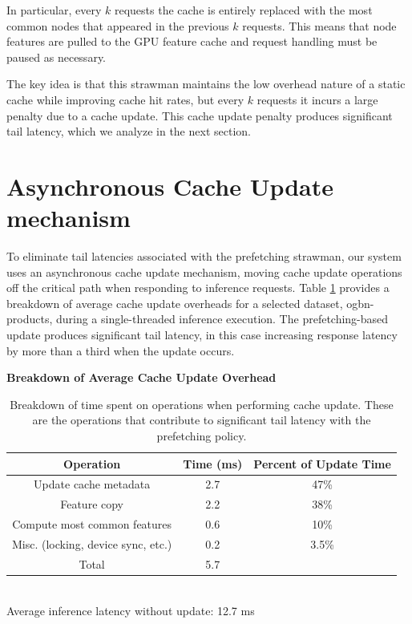 In particular, every $k$ requests the cache is entirely replaced with the most common nodes that appeared in the previous $k$ requests. This means that node features are pulled to the GPU feature cache and request handling must be paused as necessary. 

The key idea is that this strawman maintains the low overhead nature of a static cache while improving cache hit rates, but every $k$ requests it incurs a large penalty due to a cache update. This cache update penalty produces significant tail latency, which we analyze in the next section.

\section{Asynchronous Cache Update mechanism} \label{Design: Async Update}
 
To eliminate tail latencies associated with the prefetching strawman, our system uses an asynchronous cache update mechanism, moving cache update operations off the critical path when responding to inference requests.
Table \ref{Update latencies} provides a breakdown of average cache update overheads for a selected dataset, ogbn-products, during a single-threaded inference execution. The prefetching-based update produces significant tail latency, in this case increasing response latency by more than a third when the update occurs.

\begin{table}[h!]
    \begin{center}
        \textbf{Breakdown of Average Cache Update Overhead}
        \begin{tabular}{|c c c|} 
        \hline
        \textbf{Operation} & \textbf{Time (ms)} & \textbf{Percent of Update Time} \\ [0.5ex] 
        \hline\hline
        Update cache metadata & 2.7 & 47\%  \\
        \hline
        Feature copy & 2.2 & 38\% \\
        \hline
        Compute most common features & 0.6 & 10\% \\
        \hline
        Misc. (locking, device sync, etc.) & 0.2 & 3.5\% \\
        \hline
        Total & 5.7 & \\
        \hline
        \end{tabular} \\
        Average inference latency without update: 12.7 ms
    \end{center}
    
    \caption{Breakdown of time spent on operations when performing cache update.
    These are the operations that contribute to significant tail latency with the prefetching policy.
    }
    \label{Update latencies}
\end{table}

